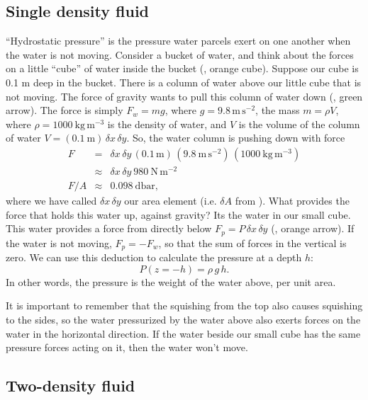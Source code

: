 \subsection{Single density fluid}
``Hydrostatic pressure'' is the pressure water parcels exert on one another when the water is not moving.  Consider a
bucket of water, and think about the forces on a little ``cube''  of
water inside the bucket (, orange cube).  Suppose our cube is 0.1 m deep in the
bucket. There is a column of water above our little cube that is not
moving.  The force of gravity wants to pull this column of water
down (, green arrow).  The force is simply $F_{w}=mg$, where $g=9.8\, \mathrm{m\,s^{-2}}$, the mass $m=\rho V$, where
$\rho = 1000\ \mathrm{kg\,m^{-3}}$ is the density of water, and $V$ is the
volume of the column of water $V = (0.1 \ \mathrm{m})\,\delta x\,\delta y$.  So, the water column
is pushing down with force 
\begin{eqnarray*}
F&=&\delta x\,\delta y\,(0.1\,\mathrm{m})\,
(9.8\ \mathrm{m\,s^{-2}})\,(1000\ \mathrm{kg\,m^{-3}})\\
&\approx &\delta x\,\delta y\ 980\ \mathrm{N\,m^{-2}}\\
F/A &\approx & 0.098\ \mathrm{dbar},
\end{eqnarray*}
where we have called $\delta x\, \delta y$ our area element (i.e. $\delta A$ from ).   
What provides the force that holds this water up, against gravity?  Its the water in our small cube. This water provides a force from directly below $F_{p}=P\,\delta x\,\delta y$ (, orange arrow).  If the water is not moving, $F_{p}=-F_{w}$, so that the sum of forces in the vertical is zero.
We can use this deduction to calculate the pressure at a depth $h$:
\begin{equation}
P(z=-h) = \rho\,g\,h.
\end{equation}
In other words, the pressure is the weight of the water above, per unit area.

It is important to remember that the squishing from the top also causes squishing to the sides, so the water pressurized by the water above also exerts forces on the water in the horizontal direction.  If the water beside our small cube has the same pressure forces acting on it, then the water won't move.  

\subsection{Two-density fluid}

